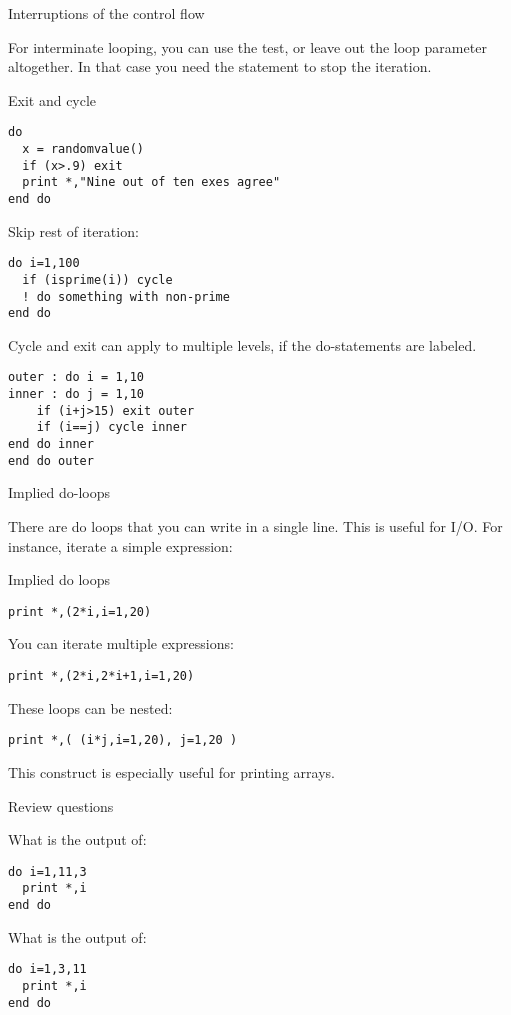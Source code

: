  {Interruptions of the control flow}

For interminate looping, you can use the  test,
or leave out the loop parameter altogether.
In that case you need the  statement to stop the iteration.

\begin{block}{Exit and cycle}
  \label{sl:loopexit}
\begin{verbatim}
do
  x = randomvalue()
  if (x>.9) exit
  print *,"Nine out of ten exes agree"
end do
\end{verbatim}

Skip rest of iteration:
\begin{verbatim}
do i=1,100
  if (isprime(i)) cycle
  ! do something with non-prime
end do
\end{verbatim}
\end{block}

Cycle and exit can apply to multiple levels, if the do-statements are
labeled.

\begin{verbatim}
outer : do i = 1,10
inner : do j = 1,10
    if (i+j>15) exit outer
    if (i==j) cycle inner
end do inner
end do outer
\end{verbatim}

 {Implied do-loops}
\label{sec:f-impdo}

There are do loops that you can write in a single line. This is useful
for I/O. For instance, iterate a simple expression:

\begin{block}{Implied do loops}
  \label{sl:implieddo}
\begin{verbatim}
print *,(2*i,i=1,20)
\end{verbatim}
You can iterate multiple expressions:
\begin{verbatim}
print *,(2*i,2*i+1,i=1,20)
\end{verbatim}
These loops can be nested:
\begin{verbatim}
print *,( (i*j,i=1,20), j=1,20 )
\end{verbatim}
\end{block}

This construct is especially useful for printing arrays.

 {Review questions}

\begin{exercise}
  \label{ex:floop-inf}
  What is the output of:
\begin{verbatim}
do i=1,11,3
  print *,i
end do
\end{verbatim}
What is the output of:
\begin{verbatim}
do i=1,3,11
  print *,i
end do
\end{verbatim}
\end{exercise}
